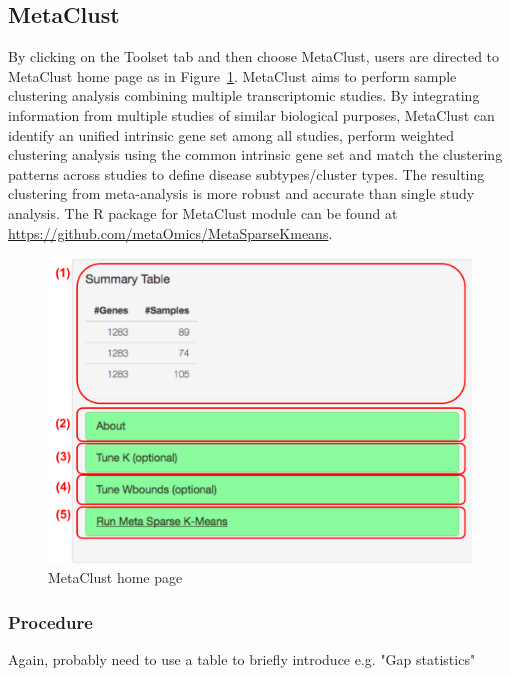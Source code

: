 \subsection{MetaClust}
By clicking on the Toolset tab and then choose MetaClust,
users are directed to MetaClust home page as in Figure~\ref{fig:metaClustHome}.
MetaClust \citep{huo2016meta} aims to perform sample clustering analysis combining multiple transcriptomic studies.
By integrating information from multiple studies of similar biological purposes,
MetaClust can identify an unified intrinsic gene set among all studies, perform weighted clustering analysis using the common intrinsic gene set and
match the clustering patterns across studies to define disease subtypes/cluster types.
The resulting clustering from meta-analysis is more robust and accurate than single study analysis.
The R package for MetaClust module can be found at \url{https://github.com/metaOmics/MetaSparseKmeans}.


\begin{figure}[H]
\begin{center}
\includegraphics[scale=0.4]{./figure/metaClust/metaClustHome.pdf}
\caption{MetaClust home page}
\label{fig:metaClustHome}
\end{center}
\end{figure}

\subsubsection{Procedure}

{
\color{red}
Again, probably need to use a table to briefly introduce e.g. "Gap statistics"
}

